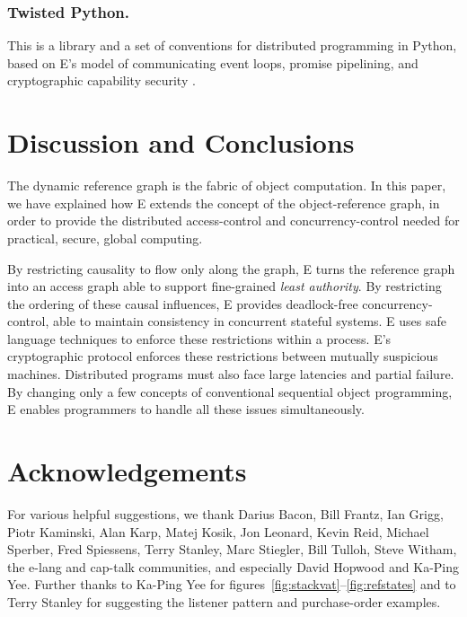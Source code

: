\documentclass{llncs}
\begin{document}
\subsubsection{Twisted Python.} This is a library and a set of
conventions for distributed programming in Python, based on E's model
of communicating event loops, promise pipelining, and cryptographic
capability security \cite{twisted}.

\section{Discussion and Conclusions}


The dynamic reference graph is the fabric of object computation. In
this paper, we have explained how E extends the concept of the
object-reference graph, in order to provide the distributed
access-control and concurrency-control needed for practical, secure,
global computing.

By restricting causality to flow only along the graph, E turns the
reference graph into an access graph able to support fine-grained
\emph{least authority}. By restricting the ordering of these causal
influences, E provides deadlock-free concurrency-control, able to
maintain consistency in concurrent stateful systems.  E uses safe
language techniques to enforce these restrictions within a
process. E's cryptographic protocol enforces these restrictions
between mutually suspicious machines. Distributed programs must also
face large latencies and partial failure. By changing only a few
concepts of conventional sequential object programming, E enables
programmers to handle all these issues simultaneously.

\section{Acknowledgements}
For various helpful suggestions, we thank
Darius Bacon,
Bill Frantz,
Ian Grigg,
Piotr Kaminski,
Alan Karp,
Matej Kosik,
Jon Leonard,
Kevin Reid,
Michael Sperber,
Fred Spiessens,
Terry Stanley,
Marc Stiegler,
Bill Tulloh,
Steve Witham,
the e-lang and cap-talk communities,
and especially
David Hopwood and
Ka-Ping Yee.
Further thanks to Ka-Ping Yee for
figures~\ref{fig:stackvat}--\ref{fig:refstates}
and to Terry Stanley for suggesting the listener pattern
and purchase-order examples.


%

\end{document}
